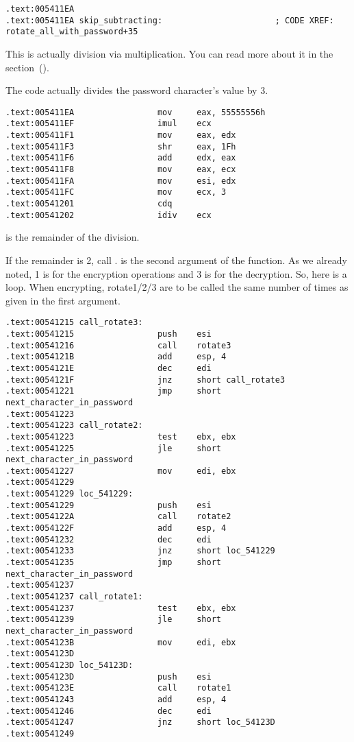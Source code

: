 \begin{lstlisting}[style=customasmx86]
.text:005411EA
.text:005411EA skip_subtracting:                       ; CODE XREF: rotate_all_with_password+35
\end{lstlisting}

This is actually division via multiplication. 
You can read more about it in the \q{\DivisionByMultSectionName} section~().

The code actually divides the password character's value by 3.
\begin{lstlisting}[style=customasmx86]
.text:005411EA                 mov     eax, 55555556h
.text:005411EF                 imul    ecx
.text:005411F1                 mov     eax, edx
.text:005411F3                 shr     eax, 1Fh
.text:005411F6                 add     edx, eax
.text:005411F8                 mov     eax, ecx
.text:005411FA                 mov     esi, edx
.text:005411FC                 mov     ecx, 3
.text:00541201                 cdq
.text:00541202                 idiv    ecx
\end{lstlisting}

\EDX is the remainder of the division.



If the remainder is 2, call . 
\EDI is the second argument of the  function.
As we already noted, 1 is for the encryption operations and 3 is for the decryption. 
So, here is a loop. When encrypting, rotate1/2/3 are to be called the same number of times as 
given in the first argument.

\begin{lstlisting}[style=customasmx86]
.text:00541215 call_rotate3:
.text:00541215                 push    esi
.text:00541216                 call    rotate3
.text:0054121B                 add     esp, 4
.text:0054121E                 dec     edi
.text:0054121F                 jnz     short call_rotate3
.text:00541221                 jmp     short next_character_in_password
.text:00541223
.text:00541223 call_rotate2:
.text:00541223                 test    ebx, ebx
.text:00541225                 jle     short next_character_in_password
.text:00541227                 mov     edi, ebx
.text:00541229
.text:00541229 loc_541229:
.text:00541229                 push    esi
.text:0054122A                 call    rotate2
.text:0054122F                 add     esp, 4
.text:00541232                 dec     edi
.text:00541233                 jnz     short loc_541229
.text:00541235                 jmp     short next_character_in_password
.text:00541237
.text:00541237 call_rotate1:
.text:00541237                 test    ebx, ebx
.text:00541239                 jle     short next_character_in_password
.text:0054123B                 mov     edi, ebx
.text:0054123D
.text:0054123D loc_54123D:
.text:0054123D                 push    esi
.text:0054123E                 call    rotate1
.text:00541243                 add     esp, 4
.text:00541246                 dec     edi
.text:00541247                 jnz     short loc_54123D
.text:00541249
\end{lstlisting}

